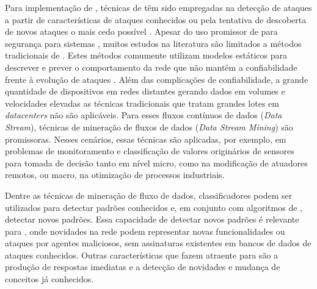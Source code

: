 Para implementação de \nids, técnicas de \ml têm sido empregadas na detecção de
ataques a partir de características de ataques conhecidos ou pela tentativa de descoberta de novos ataques o mais cedo
possível \cite{buczak2016survey,mitchell2014survey}.
Apesar do uso promissor de \ml para segurança para sistemas \iot, muitos estudos
na literatura \cite{buczak2016survey,mitchell2014survey,Tahsien2020} são
limitados a métodos tradicionais de \ml.
Estes métodos comumente utilizam modelos estáticos para descrever e prever o
comportamento da rede que não mantêm a confiabilidade frente à evolução de ataques \cite{Viegas2019,AndreoniLopez2019}.
Além das complicações de confiabilidade, a grande quantidade de dispositivos em
redes distantes gerando dados em volumes e velocidades elevadas as 
técnicas tradicionais que tratam grandes lotes em \emph{datacenters} não são aplicáveis.
Para esses fluxos contínuos de dados (\emph{Data Stream}), técnicas de
mineração de fluxos de dados (\emph{Data Stream Mining}) são promissoras.
% 
Nesses cenários, essas técnicas são aplicadas, por exemplo, em problemas de
monitoramento e classificação de valores originários de sensores para tomada de
decisão tanto em nível micro, como na modificação de atuadores remotos, ou
macro, na otimização de processos industriais.
% 


Dentre as técnicas de mineração de fluxo de dados, classificadores podem ser
utilizados para detectar padrões conhecidos e, em conjunto com algoritmos de
\nd, detectar novos padrões.
Essa capacidade de detectar novos padrões é relevante para \nids, onde novidades
na rede podem representar novas funcionalidades ou ataques por agentes
maliciosos, sem assinaturas existentes em bancos de dados de ataques conhecidos.
Outras características que fazem \nd atraente para \nids são a produção de
respostas imediatas e a detecção de novidades e mudança de conceitos já
conhecidos.

